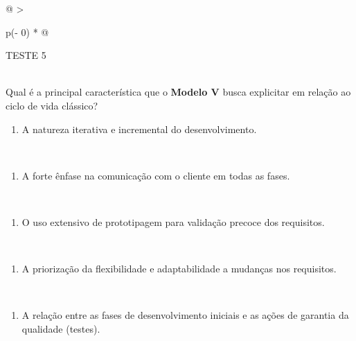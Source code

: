 \documentclass[
]{book}
\providecommand{\tightlist}{%
  \setlength{\itemsep}{0pt}\setlength{\parskip}{0pt}}
\begin{document}
\begin{longtable}[]{@{}
  >{\raggedright\arraybackslash}p{(\columnwidth - 0\tabcolsep) * }@{}}
\toprule\noalign{}
\begin{minipage}[b]{\linewidth}\raggedright
TESTE 5
\end{minipage} \\
\midrule\noalign{}
\endhead
\bottomrule\noalign{}
\endlastfoot
Qual é a principal característica que o \textbf{Modelo V} busca explicitar em relação ao ciclo de vida clássico? \\
\begin{minipage}[t]{\linewidth}\raggedright
\begin{enumerate}
\def\labelenumi{\Alph{enumi})}
\tightlist
\item
  A natureza iterativa e incremental do desenvolvimento.
\end{enumerate}
\end{minipage} \\
\begin{minipage}[t]{\linewidth}\raggedright
\begin{enumerate}
\def\labelenumi{\Alph{enumi})}
\setcounter{enumi}{1}
\tightlist
\item
  A forte ênfase na comunicação com o cliente em todas as fases.
\end{enumerate}
\end{minipage} \\
\begin{minipage}[t]{\linewidth}\raggedright
\begin{enumerate}
\def\labelenumi{\Alph{enumi})}
\setcounter{enumi}{2}
\tightlist
\item
  O uso extensivo de prototipagem para validação precoce dos requisitos.
\end{enumerate}
\end{minipage} \\
\begin{minipage}[t]{\linewidth}\raggedright
\begin{enumerate}
\def\labelenumi{\Alph{enumi})}
\setcounter{enumi}{3}
\tightlist
\item
  A priorização da flexibilidade e adaptabilidade a mudanças nos requisitos.
\end{enumerate}
\end{minipage} \\
\begin{minipage}[t]{\linewidth}\raggedright
\begin{enumerate}
\def\labelenumi{\Alph{enumi})}
\setcounter{enumi}{4}
\tightlist
\item
  A relação entre as fases de desenvolvimento iniciais e as ações de garantia da qualidade (testes).
\end{enumerate}
\end{minipage} \\
\end{longtable}
\end{document}
